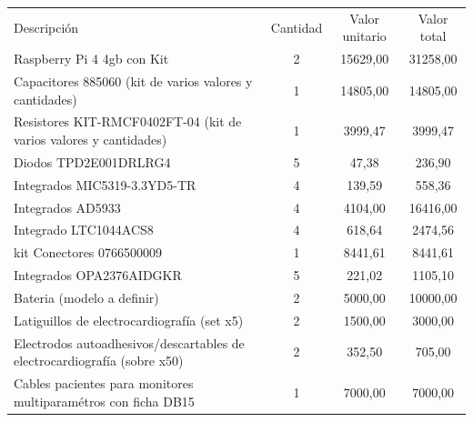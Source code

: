 \documentclass[11pt]{charter}
\begin{document}
\begin{table}[htpb]
\centering
\begin{tabularx}{\linewidth}{@{}|X|c|r|r|@{}}
\hline
\rowcolor[HTML]{C0C0C0} 
\multicolumn{4}{|c|}{\cellcolor[HTML]{C0C0C0}COSTOS DIRECTOS} \\ \hline
\rowcolor[HTML]{C0C0C0} 
Descripción &
  \multicolumn{1}{c|}{\cellcolor[HTML]{C0C0C0}Cantidad} &
  \multicolumn{1}{c|}{\cellcolor[HTML]{C0C0C0}Valor unitario} &
  \multicolumn{1}{c|}{\cellcolor[HTML]{C0C0C0}Valor total} \\ \hline
 Raspberry Pi 4 4gb con Kit & 
  \multicolumn{1}{c|}{2} & 
  \multicolumn{1}{c|}{15629,00} & 
  \multicolumn{1}{c|}{31258,00} \\ \hline
Capacitores 885060 (kit de varios valores y cantidades) &
  \multicolumn{1}{c|}{1} & 
  \multicolumn{1}{c|}{14805,00} & 
  \multicolumn{1}{c|}{14805,00} \\ \hline
 Resistores KIT-RMCF0402FT-04 (kit de varios valores y cantidades) &
   \multicolumn{1}{c|}{1} & 
  \multicolumn{1}{c|}{3999,47} & 
  \multicolumn{1}{c|}{3999,47} \\ \hline
Diodos TPD2E001DRLRG4 &
   \multicolumn{1}{c|}{5} & 
  \multicolumn{1}{c|}{47,38} & 
  \multicolumn{1}{c|}{236,90} \\ \hline
Integrados MIC5319-3.3YD5-TR & 
  \multicolumn{1}{c|}{4} & 
  \multicolumn{1}{c|}{139,59} & 
  \multicolumn{1}{c|}{558,36} \\ \hline
Integrados AD5933 &
  \multicolumn{1}{c|}{4} & 
  \multicolumn{1}{c|}{4104,00} & 
  \multicolumn{1}{c|}{16416,00} \\ \hline
Integrado LTC1044ACS8 &
   \multicolumn{1}{c|}{4} & 
  \multicolumn{1}{c|}{618,64} & 
  \multicolumn{1}{c|}{2474,56} \\ \hline
kit Conectores 0766500009 &
   \multicolumn{1}{c|}{1} & 
  \multicolumn{1}{c|}{8441,61} & 
  \multicolumn{1}{c|}{8441,61} \\ \hline
Integrados OPA2376AIDGKR &
   \multicolumn{1}{c|}{5} & 
  \multicolumn{1}{c|}{221,02} & 
  \multicolumn{1}{c|}{1105,10} \\ \hline
Bateria  (modelo a definir) &
  \multicolumn{1}{c|}{2} & 
  \multicolumn{1}{c|}{5000,00} & 
  \multicolumn{1}{c|}{10000,00} \\ \hline
Latiguillos de electrocardiografía (set x5) &
  \multicolumn{1}{c|}{2} &
  \multicolumn{1}{c|}{1500,00} &
  \multicolumn{1}{c|}{3000,00} \\ \hline
Electrodos autoadhesivos/descartables de electrocardiografía (sobre x50) &
  \multicolumn{1}{c|}{2} &
  \multicolumn{1}{c|}{352,50} &
  \multicolumn{1}{c|}{705,00} \\ \hline
Cables pacientes para monitores multiparamétros con ficha DB15 &
  \multicolumn{1}{c|}{1} &
  \multicolumn{1}{c|}{7000,00} &
  \multicolumn{1}{c|}{7000,00} \\ \hline



\end{tabularx}
\end{table}
\end{document}
